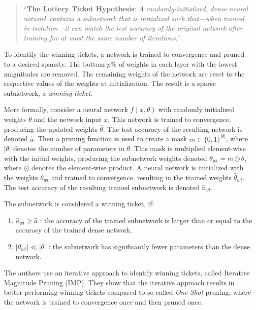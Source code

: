 \begin{quote}
    “\textbf{The Lottery Ticket Hypothesis}: \textit{A randomly-initialized, dense neural network contains a subnetwork that is initialized such that—when trained in isolation—it can match the test accuracy of the original network after training for at most the same number of iterations.}” \cite{DBLP:conf/iclr/FrankleC19}
\end{quote}

To identify the winning tickets, a network is trained to convergence and pruned to a desired sparsity. 
The bottom $p$\% of weights in each layer with the lowest magnitudes are removed. 
The remaining weights of the network are reset to the respective values of the weights at initialization.
The result is a sparse subnetwork, a \textit{winning ticket}.

More formally, consider a neural network $f(x, \theta)$ with randomly initialized weights $\theta$ and the network input $x$.
This network is trained to convergence, producing the updated weights $\hat \theta$. The test accuracy of the resulting network is denoted $\hat a$.
Then a pruning function is used to create a mask $m \in \{0,1\}^{|\theta|}$, where $|\theta|$ denotes the number of parameters in $\theta$.
This mask is multiplied element-wise with the initial weights, producing the subnetwork weights denoted $\theta_{wt} = m \odot \theta$, where $\odot$ denotes the element-wise product.
A neural network is initialized with the weights $\theta_{wt}$ and trained to convergence, resulting in the trained weights $\hat \theta_{wt}$. 
The test accuracy of the resulting trained subnetwork is denoted $\hat a_{wt}$.

The subnetwork is considered a winning ticket, if:
\begin{enumerate}
  \item  $\hat a_{wt} \geq \hat a$ :  the accuracy of the trained subnetwork is larger than or equal to the accuracy of the  trained dense network.
  \item $|\theta_{wt}| \ll |\theta|$ : the subnetwork has significantly fewer parameters than the dense network.
\end{enumerate}

The authors use an iterative approach to identify winning tickets, called Iterative Magnitude Pruning (IMP).
They show that the iterative approach results in better performing winning tickets compared to so called \textit{One-Shot} pruning, where the network is trained to convergence once and then pruned once.

